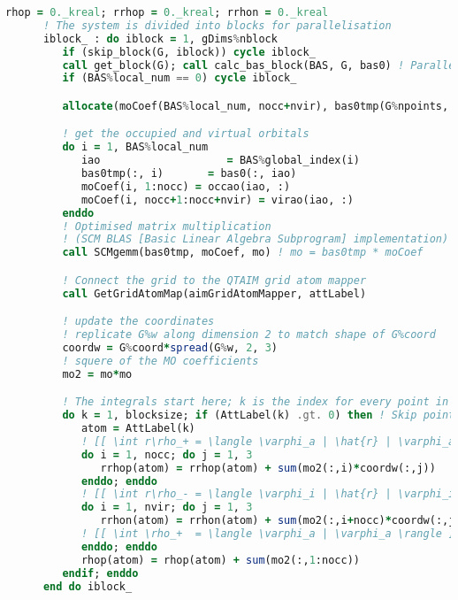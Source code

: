 
\begin{lstlisting}[language=Fortran, style=mystyle, basicstyle=\tiny]
      rhop = 0._kreal; rrhop = 0._kreal; rrhon = 0._kreal
      ! The system is divided into blocks for parallelisation
      iblock_ : do iblock = 1, gDims%nblock
         if (skip_block(G, iblock)) cycle iblock_
         call get_block(G); call calc_bas_block(BAS, G, bas0) ! Parallel stuff
         if (BAS%local_num == 0) cycle iblock_

         allocate(moCoef(BAS%local_num, nocc+nvir), bas0tmp(G%npoints, BAS%local_num))

         ! get the occupied and virtual orbitals
         do i = 1, BAS%local_num
            iao                    = BAS%global_index(i)
            bas0tmp(:, i)       = bas0(:, iao)
            moCoef(i, 1:nocc) = occao(iao, :)
            moCoef(i, nocc+1:nocc+nvir) = virao(iao, :)
         enddo
         ! Optimised matrix multiplication
         ! (SCM BLAS [Basic Linear Algebra Subprogram] implementation)
         call SCMgemm(bas0tmp, moCoef, mo) ! mo = bas0tmp * moCoef

         ! Connect the grid to the QTAIM grid atom mapper
         call GetGridAtomMap(aimGridAtomMapper, attLabel)

         ! update the coordinates
         ! replicate G%w along dimension 2 to match shape of G%coord
         coordw = G%coord*spread(G%w, 2, 3)
         ! squere of the MO coefficients
         mo2 = mo*mo

         ! The integrals start here; k is the index for every point in the block
         do k = 1, blocksize; if (AttLabel(k) .gt. 0) then ! Skip points with no label
            atom = AttLabel(k)
            ! [[ \int r\rho_+ = \langle \varphi_a | \hat{r} | \varphi_a \rangle ]]
            do i = 1, nocc; do j = 1, 3
               rrhop(atom) = rrhop(atom) + sum(mo2(:,i)*coordw(:,j))
            enddo; enddo
            ! [[ \int r\rho_- = \langle \varphi_i | \hat{r} | \varphi_i \rangle ]]
            do i = 1, nvir; do j = 1, 3
               rrhon(atom) = rrhon(atom) + sum(mo2(:,i+nocc)*coordw(:,j))
            ! [[ \int \rho_+  = \langle \varphi_a | \varphi_a \rangle ]]
            enddo; enddo
            rhop(atom) = rhop(atom) + sum(mo2(:,1:nocc))
         endif; enddo
      end do iblock_
\end{lstlisting}


